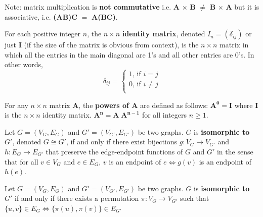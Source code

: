 \documentclass{article}
\begin{document}
\begin{description}
	\item \qquad Note: matrix multiplication is \textbf{not commutative} i.e. \textbf{A} $\times$ \textbf{B} $\neq$ \textbf{B} $\times$ \textbf{A} but it is associative, i.e. \textbf{(AB)C} $=$ \textbf{A(BC)}.
	\item[Identity Matrix]For each positive integer $n$, the $n\times n$ \textbf{identity matrix}, denoted $I_{n} = (\delta_{ij})$ or just \textbf{I} (if the size of the matrix is obvious from context), is the $n\times n$ matrix in which all the entries in the main
diagonal are 1’s and all other entries are 0’s. In other words, 
	\[ 
		\delta_{ij}=
		\begin{cases}
			\text{1, if $i=j$} \\
			\text{0, if $i\neq j$} \\
		\end{cases}
	\]
    \item[$\mathbf{n^{th}}$ Power of a Matrix] For any $n \times n$ matrix \textbf{A}, the \textbf{powers of A} are defined as follows: $\mathbf{A^{0}}=\mathbf{I}$ where \textbf{I} is the $n \times n$ identity matrix. $\mathbf{A^{n}}=\mathbf{A\;A^{n-1}}$ for all integers $n\geq 1$.
    \item[Isomorphic Graph] Let $G=(V_{G}, E_{G})$ and $G'=(V_{G'}, E_{G'})$ be two graphs. $G$ is \textbf{isomorphic to} $G'$, denoted $G\cong G'$, if and only if there exist bijections $g:V_{G}\to V_{G'}$ and $h:E_{G}\to E_{G'}$ that preserve the edge-endpoint functions of $G$ and $G'$ in the sense that for all $v\in V_{G}$ and $e\in E_{G}$, $v$ is an endpoint of $e\Leftrightarrow g(v)$ is an endpoint of $h(e)$.
    \item[Alternative definition of Isomorphic Graph] Let $G=(V_{G}, E_{G})$ and $G'=(V_{G'}, E_{G'})$ be two graphs. $G$ is \textbf{isomorphic to} $G'$ if and only if there exists a permutation $\pi:V_{G}\to V_{G'}$ such that $\{u,v\}\in E_{G}\Leftrightarrow \{\pi(u),\pi(v)\}\in E_{G'}$
    

\end{description}
\end{document}

